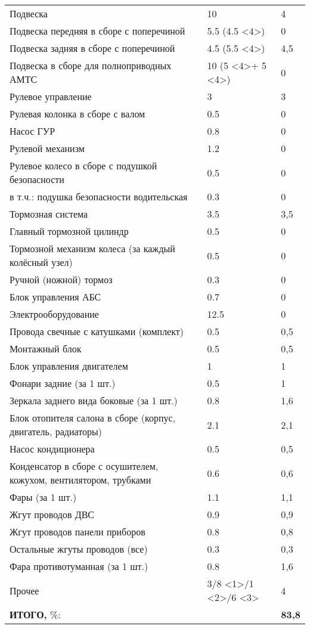 \begin{longtable}{|p{9cm}|p{4cm}|p{2cm}|}
 		Подвеска & 10 & 4 \\
 		Подвеска передняя в сборе с поперечиной & 5.5 (4.5 \textless{}4\textgreater{}) & 0 \\
 		Подвеска задняя в сборе с поперечиной & 4.5 (5.5 \textless{}4\textgreater{}) & 4,5 \\
 		Подвеска в сборе для полноприводных АМТС & 10 (5 \textless{}4\textgreater + 5 \textless{}4\textgreater{}) & 0 \\
 		Рулевое управление & 3 & 3 \\
 		Рулевая колонка в сборе с валом & 0.5 & 0 \\
 		Насос ГУР & 0.8 & 0 \\
 		Рулевой механизм & 1.2 & 0 \\
 		Рулевое колесо в сборе с подушкой безопасности & 0.5 & 0 \\
 		в т.ч.: подушка безопасности  водительская & 0.3 & 0 \\
 		Тормозная система & 3.5 & 3,5 \\
 		Главный тормозной цилиндр & 0.5 & 0 \\
 		Тормозной механизм колеса (за каждый колёсный узел) & 0.5 & 0 \\
 		Ручной (ножной) тормоз & 0.3 & 0 \\
 		Блок управления АБС & 0.7 & 0 \\
 		Электрооборудование & 12.5 & 0 \\
 		Провода свечные с катушками (комплект) & 0.5 & 0,5 \\
 		Монтажный блок & 0.5 & 0,5 \\
 		Блок управления двигателем & 1 & 1 \\
 		Фонари задние (за 1 шт.) & 0.5 & 1 \\
 		Зеркала заднего вида боковые (за 1 шт.) & 0.8 & 1,6 \\
 		Блок отопителя салона в сборе (корпус, двигатель, радиаторы) & 2.1 & 2,1 \\
 		Насос кондиционера & 0.5 & 0,5 \\
 		Конденсатор в сборе с осушителем, кожухом, вентилятором, трубками & 0.6 & 0,6 \\
 		Фары (за 1 шт.) & 1.1 & 1,1 \\
 		Жгут проводов ДВС & 0.9 & 0,9 \\
 		Жгут проводов панели приборов & 0.8 & 0,8 \\
 		Остальные жгуты проводов (все) & 0.3 & 0,3 \\
 		Фара противотуманная (за 1 шт.) & 0.8 & 1,6 \\ 
 		Прочее & 3/8 \textless{}1\textgreater{}/1 \textless{}2\textgreater /6 \textless{}3\textgreater{} & 4 \\
 		\hline
 		\textbf{ИТОГО,} \%: &  & \textbf{83,8}  \\
 		\hline	
 	\end{longtable}
 
